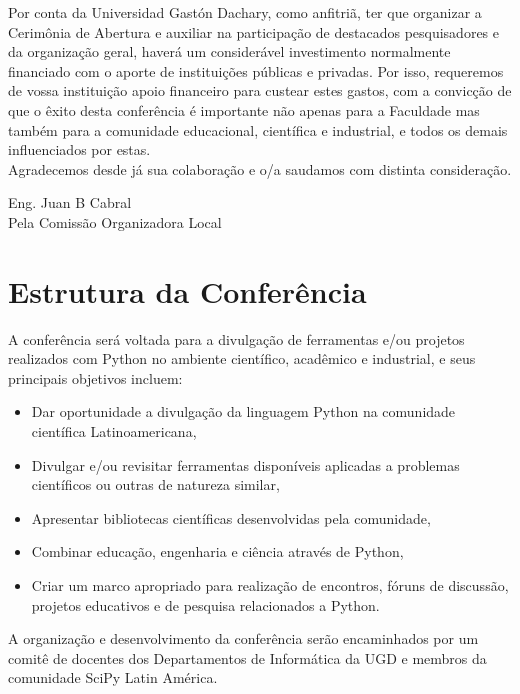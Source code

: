\documentclass[11pt,a4paper]{report}
\begin{document}
Por conta da Universidad Gastón Dachary, como
anfitriã, ter que organizar a Cerimônia de Abertura e auxiliar
na participação de destacados pesquisadores e da organização geral, haverá um
considerável investimento normalmente financiado com o aporte de
instituições públicas e privadas. Por isso, requeremos de vossa
instituição apoio financeiro para custear estes gastos, com a convicção
de que o êxito desta conferência é importante não apenas para a
Faculdade mas também para a comunidade educacional, científica e industrial, e
todos os demais influenciados por estas.\\[0.1cm]

Agradecemos desde já sua colaboração e o/a saudamos
com distinta consideração.\\[0.1cm]



\begin{flushright}
Eng. Juan B Cabral\\
Pela Comissão Organizadora Local \\

\end{flushright}
\newpage
\section*{Estrutura da Conferência}

    A conferência será voltada para a divulgação de ferramentas e/ou
    projetos realizados com Python no ambiente científico, acadêmico e
    industrial, e seus principais objetivos incluem:

  \begin{itemize}
    \item Dar oportunidade a divulgação da linguagem Python na comunidade científica Latinoamericana,
    \item Divulgar e/ou revisitar ferramentas disponíveis aplicadas a problemas científicos ou outras de natureza similar,
    \item Apresentar bibliotecas científicas desenvolvidas pela comunidade,
    \item Combinar educação, engenharia e ciência através de Python,
    \item Criar um marco apropriado para realização de encontros, fóruns de discussão, projetos educativos e de pesquisa relacionados a Python.
  \end{itemize}

A organização e desenvolvimento da conferência serão encaminhados
por um comitê de docentes dos Departamentos de Informática da UGD e
membros da comunidade SciPy Latin América.\\
\end{document}

